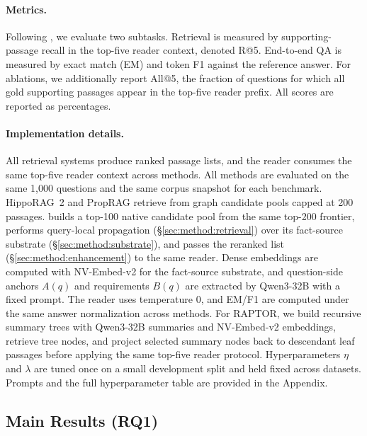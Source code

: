 \paragraph{Metrics.}
Following \citet{gutierrez2025hipporag}, we evaluate two subtasks.
Retrieval is measured by supporting-passage recall in the top-five
reader context, denoted R@5. End-to-end QA is measured by exact match
(EM) and token F1 against the reference answer. For ablations, we
additionally report All@5, the fraction of questions for which all
gold supporting passages appear in the top-five reader prefix. All
scores are reported as percentages.

\paragraph{Implementation details.}
All retrieval systems produce ranked passage lists, and the reader
consumes the same top-five reader context across methods. All methods
are evaluated on the same 1{,}000 questions and the same corpus
snapshot for each benchmark. HippoRAG~2 and PropRAG retrieve from graph
candidate pools capped at 200 passages.
\methodname{} builds a top-100 native candidate pool from the same
top-200 frontier, performs query-local propagation
(\S\ref{sec:method:retrieval}) over its fact-source substrate
(\S\ref{sec:method:substrate}), and passes the reranked list
(\S\ref{sec:method:enhancement}) to the same reader. Dense embeddings
are computed with NV-Embed-v2 for the fact-source substrate, and
question-side anchors $A(q)$ and requirements $B(q)$ are extracted by
Qwen3-32B with a fixed prompt. The reader uses temperature 0, and
EM/F1 are computed under the same answer normalization across methods.
For RAPTOR, we build recursive summary trees with Qwen3-32B summaries
and NV-Embed-v2 embeddings, retrieve tree nodes, and project selected
summary nodes back to descendant leaf passages before applying the same
top-five reader protocol.
Hyperparameters $\eta$ and $\lambda$ are tuned once on a small
development split and held fixed across datasets. Prompts and the full
hyperparameter table are provided in the Appendix.

\subsection{Main Results (RQ1)}
\label{sec:experiments:main}

